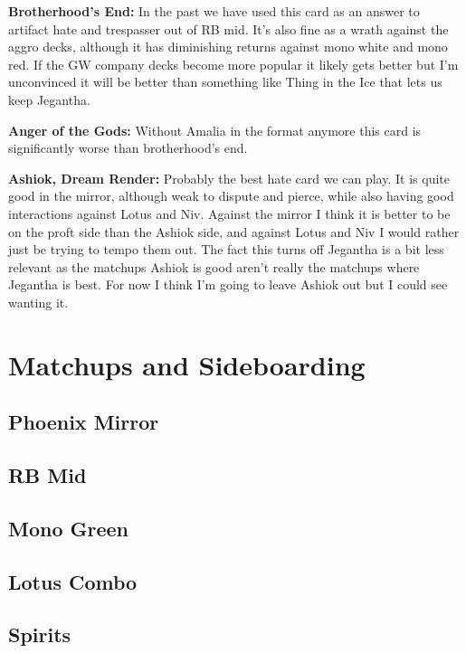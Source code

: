 \documentclass[12pt]{article}
\begin{document}
\vspace{0.4em}
\noindent \textbf{Brotherhood's End:}
In the past we have used this card as an answer to artifact hate and trespasser out of RB mid. It's also fine as a wrath against the aggro decks, although it has diminishing returns against mono white and mono red. If the GW company decks become more popular it likely gets better but I'm unconvinced it will be better than something like Thing in the Ice that lets us keep Jegantha.

\vspace{0.4em}
\noindent \textbf{Anger of the Gods:}
Without Amalia in the format anymore this card is significantly worse than brotherhood's end.

\vspace{0.4em}
\noindent \textbf{Ashiok, Dream Render:}
Probably the best hate card we can play. It is quite good in the mirror, although weak to dispute and pierce, while also having good interactions against Lotus and Niv. Against the mirror I think it is better to be on the proft side than the Ashiok side, and against Lotus and Niv I would rather just be trying to tempo them out. The fact this turns off Jegantha is a bit less relevant as the matchups Ashiok is good aren't really the matchups where Jegantha is best. For now I think I'm going to leave Ashiok out but I could see wanting it.


\clearpage
\section{Matchups and Sideboarding}
\subsection{Phoenix Mirror}

\subsection{RB Mid}

\subsection{Mono Green}

\subsection{Lotus Combo}

\subsection{Spirits}
\end{document}
